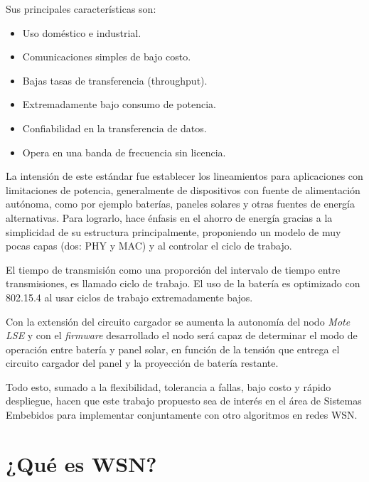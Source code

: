 \noindent Sus principales características son:
		\begin{itemize}
			\item Uso doméstico e industrial.
			\item Comunicaciones simples de bajo costo. 
			\item Bajas tasas de transferencia (throughput).
			\item Extremadamente bajo consumo de potencia.
			\item Confiabilidad en la transferencia de datos.
			\item Opera en una banda de frecuencia sin licencia.
		\end{itemize}

La intensión de este estándar fue establecer los lineamientos para aplicaciones con limitaciones de potencia, generalmente de dispositivos con fuente de alimentación autónoma, como por ejemplo baterías, paneles solares y otras fuentes de energía alternativas. Para lograrlo, hace énfasis en el ahorro de energía gracias a la simplicidad de su estructura principalmente, proponiendo un modelo de muy pocas capas (dos: PHY y MAC) y al controlar el ciclo de trabajo.

El tiempo de transmisión como una proporción del intervalo de tiempo entre transmisiones, es llamado ciclo de trabajo. El uso de la batería es optimizado con 802.15.4 al usar ciclos de trabajo extremadamente bajos. 
		
Con la extensión del circuito cargador se aumenta la autonomía del nodo \textit{Mote LSE} y con el \textit{firmware} desarrollado el nodo será capaz de determinar el modo de operación entre batería y panel solar, en función de la tensión que entrega el circuito cargador del panel y la proyección de batería restante.

Todo esto, sumado a la flexibilidad, tolerancia a fallas, bajo costo y rápido despliegue, hacen que este trabajo propuesto sea de interés en el área de Sistemas Embebidos para implementar conjuntamente con otro algoritmos en redes WSN.

\section{¿Qué es WSN?}
\label{sec:wsn}

